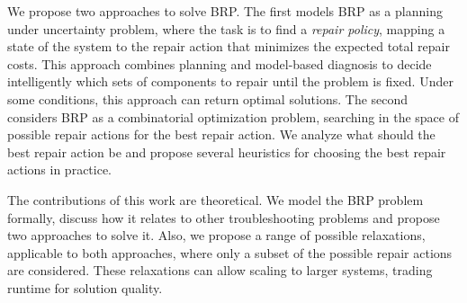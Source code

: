 
We propose two approaches to solve BRP. The first models BRP as a planning under uncertainty problem, where the task is to find a {\em repair policy}, mapping a state of the system to the repair action that minimizes the expected total repair costs. %
This approach combines planning and model-based diagnosis to decide intelligently which sets of components to repair until the problem is fixed. Under some conditions, this approach can return optimal solutions.
The second considers BRP as a combinatorial optimization problem, searching in the space of possible repair actions for the best repair action. We analyze what should the best repair action be and propose several heuristics for choosing the best repair actions in practice.



The contributions of this work are theoretical. We model the BRP problem formally, discuss how it relates to other troubleshooting problems and propose two approaches to solve it. Also, we propose a range of possible relaxations, applicable to both approaches, where only a subset of the possible repair actions are considered. These relaxations can allow scaling to larger systems, trading runtime for solution quality.

